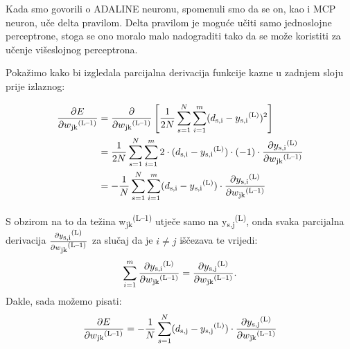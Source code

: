 \documentclass[times, utf8, zavrsni]{fer}
\begin{document}
Kada smo govorili o ADALINE neuronu, spomenuli smo da se on, kao i MCP neuron, uče delta pravilom. Delta pravilom je moguće učiti samo jednoslojne perceptrone, stoga se ono moralo malo nadograditi tako da se može koristiti za učenje višeslojnog perceptrona.


Pokažimo kako bi izgledala parcijalna derivacija funkcije kazne u zadnjem sloju prije izlaznog:

\begin{align}
    \label{eq:4-26}
    \frac{\partial E}{\partial w\textsubscript{jk}\textsuperscript{(L--1)}} &= \frac{\partial}{\partial w\textsubscript{jk}\textsuperscript{(L--1)}}\left[\frac{1}{2N}\sum\limits_{s=1}^N\sum\limits_{i=1}^m(d\textsubscript{s,i} - y\textsubscript{s,i}\textsuperscript{(L)})^2\right] \\
    &= \frac{1}{2N}\sum\limits_{s=1}^N\sum\limits_{i=1}^m2\cdot{(d\textsubscript{s,i} - y\textsubscript{s,i}\textsuperscript{(L)}}) \cdot{(-1)} \cdot{\frac{\partial y\textsubscript{s,i}\textsuperscript{(L)}}{\partial w\textsubscript{jk}\textsuperscript{(L--1)}}} \\
    &= -\frac{1}{N}\sum\limits_{s=1}^N\sum\limits_{i=1}^m(d\textsubscript{s,i} - y\textsubscript{s,i}\textsuperscript{(L)})\cdot{\frac{\partial y\textsubscript{s,i}\textsuperscript{(L)}}{\partial w\textsubscript{jk}\textsuperscript{(L--1)}}}
\end{align}

S obzirom na to da težina w\textsubscript{jk}\textsuperscript{(L--1)} utječe samo na y\textsubscript{s,j}\textsuperscript{(L)}, onda svaka parcijalna derivacija $\frac{\partial y\textsubscript{s,i}\textsuperscript{(L)}}{\partial w\textsubscript{jk}\textsuperscript{(L--1)}}$ za slučaj da je $i\neq{j}$ iščezava te vrijedi:
\[
    \sum\limits_{i=1}^m\frac{\partial y\textsubscript{s,i}\textsuperscript{(L)}}{\partial w\textsubscript{jk}\textsuperscript{(L--1)}} = \frac{\partial y\textsubscript{s,j}\textsuperscript{(L)}}{\partial w\textsubscript{jk}\textsuperscript{(L--1)}}.
\]
Dakle, sada možemo pisati:
\begin{equation}
    \label{eq:4-27}
    \frac{\partial E}{\partial w\textsubscript{jk}\textsuperscript{(L--1)}} = -\frac{1}{N}\sum\limits_{s=1}^N(d\textsubscript{s,j} - y\textsubscript{s,j}\textsuperscript{(L)})\cdot{\frac{\partial y\textsubscript{s,j}\textsuperscript{(L)}}{\partial w\textsubscript{jk}\textsuperscript{(L--1)}}}
\end{equation}
\end{document}

